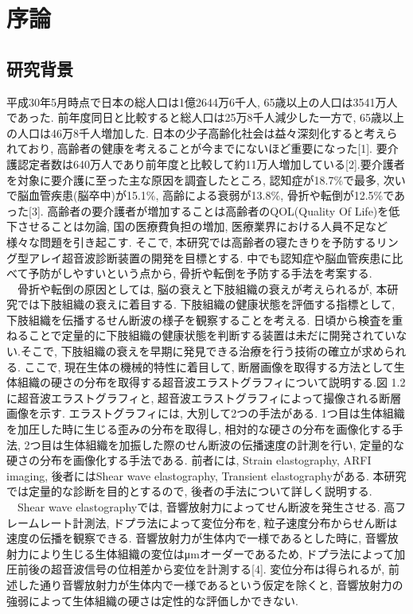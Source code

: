 \chapter{序論}
\section{研究背景}
 平成30年5月時点で日本の総人口は1億2644万6千人, 65歳以上の人口は3541万人であった. 前年度同日と比較すると総人口は25万8千人減少した一方で, 65歳以上の人口は46万8千人増加した. 日本の少子高齢化社会は益々深刻化すると考えられており, 高齢者の健康を考えることが今までにないほど重要になった[1]. 要介護認定者数は640万人であり前年度と比較して約11万人増加している[2].要介護者を対象に要介護に至った主な原因を調査したところ, 認知症が18.7\%で最多, 次いで脳血管疾患(脳卒中)が15.1\%, 高齢による衰弱が13.8\%, 骨折や転倒が12.5\%であった[3]. 高齢者の要介護者が増加することは高齢者のQOL(Quality Of Life)を低下させることは勿論, 国の医療費負担の増加, 医療業界における人員不足など様々な問題を引き起こす. そこで, 本研究では高齢者の寝たきりを予防するリング型アレイ超音波診断装置の開発を目標とする. 中でも認知症や脳血管疾患に比べて予防がしやすいという点から, 骨折や転倒を予防する手法を考案する. 
\\\ \ 骨折や転倒の原因としては, 脳の衰えと下肢組織の衰えが考えられるが, 本研究では下肢組織の衰えに着目する. 下肢組織の健康状態を評価する指標として, 下肢組織を伝播するせん断波の様子を観察することを考える. 日頃から検査を重ねることで定量的に下肢組織の健康状態を判断する装置は未だに開発されていない.そこで, 下肢組織の衰えを早期に発見できる治療を行う技術の確立が求められる. ここで, 現在生体の機械的特性に着目して, 断層画像を取得する方法として生体組織の硬さの分布を取得する超音波エラストグラフィについて説明する.図 1.2 に超音波エラストグラフィと, 超音波エラストグラフィによって撮像される断層画像を示す. エラストグラフィには, 大別して2つの手法がある. 1つ目は生体組織を加圧した時に生じる歪みの分布を取得し,  相対的な硬さの分布を画像化する手法, 2つ目は生体組織を加振した際のせん断波の伝播速度の計測を行い, 定量的な硬さの分布を画像化する手法である. 前者には, Strain elastography, ARFI imaging, 後者にはShear wave elastography, Transient elastographyがある. 本研究では定量的な診断を目的とするので, 後者の手法について詳しく説明する. 
\\\ \ Shear wave elastographyでは, 音響放射力によってせん断波を発生させる. 高フレームレート計測法, ドプラ法によって変位分布を, 粒子速度分布からせん断は速度の伝播を観察できる. 音響放射力が生体内で一様であるとした時に, 音響放射力により生じる生体組織の変位はμmオーダーであるため, ドプラ法によって加圧前後の超音波信号の位相差から変位を計測する[4]. 変位分布は得られるが, 前述した通り音響放射力が生体内で一様であるという仮定を除くと, 音響放射力の強弱によって生体組織の硬さは定性的な評価しかできない.
